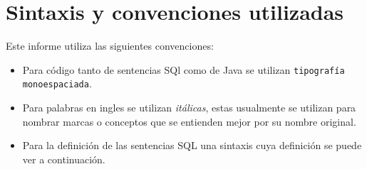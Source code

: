 \chapter{Sintaxis y convenciones utilizadas}
\label{apendice:sintaxis}
Este informe utiliza las siguientes convenciones:
%
\begin{itemize}
\item Para código tanto de sentencias SQl como de Java se utilizan \verb=tipografía monoespaciada=.
%
\item Para palabras en ingles se utilizan \textit{itálicas}, estas usualmente se utilizan para nombrar marcas o conceptos que se entienden mejor por su nombre original.
%
\item Para la definición de las sentencias SQL una sintaxis cuya definición se puede ver a continuación.
\end{itemize}
%
